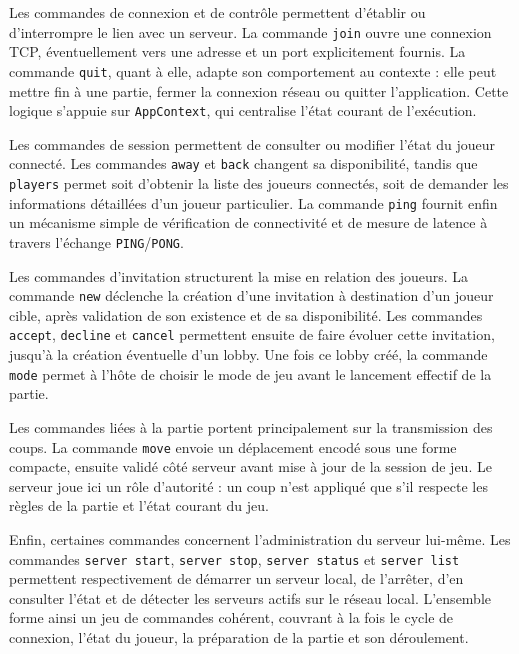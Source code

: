 \documentclass[a4paper]{article}
\begin{document}
Les commandes de connexion et de contrôle permettent d’établir ou d’interrompre le lien avec un serveur. La commande \texttt{join} ouvre une connexion TCP, éventuellement vers une adresse et un port explicitement fournis. La commande \texttt{quit}, quant à elle, adapte son comportement au contexte : elle peut mettre fin à une partie, fermer la connexion réseau ou quitter l’application. Cette logique s’appuie sur \texttt{AppContext}, qui centralise l’état courant de l’exécution.

Les commandes de session permettent de consulter ou modifier l’état du joueur connecté. Les commandes \texttt{away} et \texttt{back} changent sa disponibilité, tandis que \texttt{players} permet soit d’obtenir la liste des joueurs connectés, soit de demander les informations détaillées d’un joueur particulier. La commande \texttt{ping} fournit enfin un mécanisme simple de vérification de connectivité et de mesure de latence à travers l’échange \texttt{PING}/\texttt{PONG}.

Les commandes d’invitation structurent la mise en relation des joueurs. La commande \texttt{new} déclenche la création d’une invitation à destination d’un joueur cible, après validation de son existence et de sa disponibilité. Les commandes \texttt{accept}, \texttt{decline} et \texttt{cancel} permettent ensuite de faire évoluer cette invitation, jusqu’à la création éventuelle d’un lobby. Une fois ce lobby créé, la commande \texttt{mode} permet à l’hôte de choisir le mode de jeu avant le lancement effectif de la partie.

Les commandes liées à la partie portent principalement sur la transmission des coups. La commande \texttt{move} envoie un déplacement encodé sous une forme compacte, ensuite validé côté serveur avant mise à jour de la session de jeu. Le serveur joue ici un rôle d’autorité : un coup n’est appliqué que s’il respecte les règles de la partie et l’état courant du jeu.

Enfin, certaines commandes concernent l’administration du serveur lui-même. Les commandes \texttt{server start}, \texttt{server stop}, \texttt{server status} et \texttt{server list} permettent respectivement de démarrer un serveur local, de l’arrêter, d’en consulter l’état et de détecter les serveurs actifs sur le réseau local. L’ensemble forme ainsi un jeu de commandes cohérent, couvrant à la fois le cycle de connexion, l’état du joueur, la préparation de la partie et son déroulement.
\end{document}

